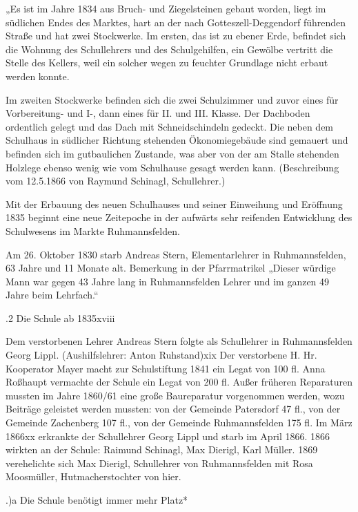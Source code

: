 \documentclass{book}
\begin{document}
„Es ist im Jahre 1834 aus Bruch- und Ziegelsteinen gebaut worden, liegt im
südlichen Endes des Marktes, hart an der nach Gotteszell-Deggendorf führenden
Straße und hat zwei Stockwerke. Im ersten, das ist zu ebener Erde, befindet sich
die Wohnung des Schullehrers und des Schulgehilfen, ein Gewölbe vertritt die
Stelle des Kellers, weil ein solcher wegen zu feuchter Grundlage nicht erbaut
werden konnte.

Im zweiten Stockwerke befinden sich die zwei Schulzimmer und zuvor eines für
Vorbereitung- und I-, dann eines für II. und III. Klasse. Der Dachboden
ordentlich gelegt und das Dach mit Schneidschindeln gedeckt. Die neben dem
Schulhaus in südlicher Richtung stehenden Ökonomiegebäude sind gemauert und
befinden sich im gutbaulichen Zustande, was aber von der am Stalle stehenden
Holzlege ebenso wenig wie vom Schulhause gesagt werden kann. (Beschreibung vom
12.5.1866 von Raymund Schinagl, Schullehrer.)

Mit der Erbauung des neuen Schulhauses und seiner Einweihung und Eröffnung 1835
beginnt eine neue Zeitepoche in der aufwärts sehr reifenden Entwicklung des
Schulwesens im Markte Ruhmannsfelden.

Am 26. Oktober 1830 starb Andreas Stern, Elementarlehrer in Ruhmannsfelden, 63
Jahre und 11 Monate alt. Bemerkung in der Pfarrmatrikel „Dieser würdige Mann war
gegen 43 Jahre lang in Ruhmannsfelden Lehrer und im ganzen 49 Jahre beim
Lehrfach.“

.2 Die Schule ab 1835xviii

Dem verstorbenen Lehrer Andreas Stern folgte als Schullehrer in Ruhmannsfelden
Georg Lippl. (Aushilfslehrer: Anton Ruhstand)xix Der verstorbene H. Hr.
Kooperator Mayer macht zur Schulstiftung 1841 ein Legat von 100 fl. Anna
Roßhaupt vermachte der Schule ein Legat von 200 fl. Außer früheren Reparaturen
mussten im Jahre 1860/61 eine große Baureparatur vorgenommen werden, wozu
Beiträge geleistet werden mussten: von der Gemeinde Patersdorf 47 fl., von der
Gemeinde Zachenberg 107 fl., von der Gemeinde Ruhmannsfelden 175 fl. Im März
1866xx erkrankte der Schullehrer Georg Lippl und starb im April 1866. 1866
wirkten an der Schule: Raimund Schinagl, Max Dierigl, Karl Müller. 1869
verehelichte sich Max Dierigl, Schullehrer von Ruhmannsfelden mit Rosa
Moosmüller, Hutmacherstochter von hier.

.)a Die Schule benötigt immer mehr Platz*
\end{document}
